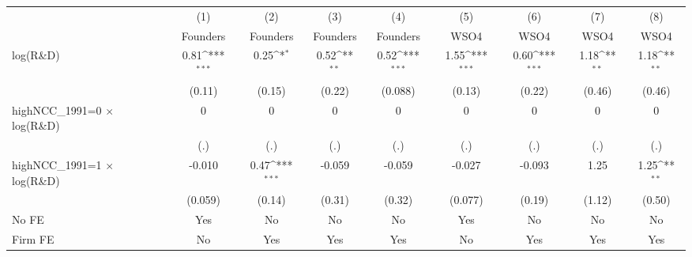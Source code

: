 {
\def\sym#1{\ifmmode^{#1}\else\(^{#1}\)\fi}
\begin{tabular}{l*{8}{c}}
\toprule
                    &\multicolumn{1}{c}{(1)}&\multicolumn{1}{c}{(2)}&\multicolumn{1}{c}{(3)}&\multicolumn{1}{c}{(4)}&\multicolumn{1}{c}{(5)}&\multicolumn{1}{c}{(6)}&\multicolumn{1}{c}{(7)}&\multicolumn{1}{c}{(8)}\\
                    &\multicolumn{1}{c}{Founders}&\multicolumn{1}{c}{Founders}&\multicolumn{1}{c}{Founders}&\multicolumn{1}{c}{Founders}&\multicolumn{1}{c}{WSO4}&\multicolumn{1}{c}{WSO4}&\multicolumn{1}{c}{WSO4}&\multicolumn{1}{c}{WSO4}\\
\midrule
log(R\&D)           &        0.81\sym{***}&        0.25\sym{*}  &        0.52\sym{**} &        0.52\sym{***}&        1.55\sym{***}&        0.60\sym{***}&        1.18\sym{**} &        1.18\sym{**} \\
                    &      (0.11)         &      (0.15)         &      (0.22)         &     (0.088)         &      (0.13)         &      (0.22)         &      (0.46)         &      (0.46)         \\
\addlinespace
highNCC\_1991=0 $\times$ log(R\&D)&           0         &           0         &           0         &           0         &           0         &           0         &           0         &           0         \\
                    &         (.)         &         (.)         &         (.)         &         (.)         &         (.)         &         (.)         &         (.)         &         (.)         \\
\addlinespace
highNCC\_1991=1 $\times$ log(R\&D)&      -0.010         &        0.47\sym{***}&      -0.059         &      -0.059         &      -0.027         &      -0.093         &        1.25         &        1.25\sym{**} \\
                    &     (0.059)         &      (0.14)         &      (0.31)         &      (0.32)         &     (0.077)         &      (0.19)         &      (1.12)         &      (0.50)         \\
\addlinespace
No FE               &         Yes         &          No         &          No         &          No         &         Yes         &          No         &          No         &          No         \\
\addlinespace
Firm FE             &          No         &         Yes         &         Yes         &         Yes         &          No         &         Yes         &         Yes         &         Yes         \\

\end{tabular}}
